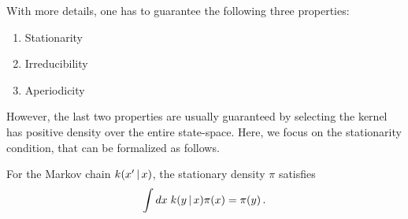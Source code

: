 With more details, one has to guarantee the following three properties:
\begin{enumerate}
    \item Stationarity 
    \item Irreducibility 
    \item Aperiodicity 
\end{enumerate}
However, the last two properties are usually guaranteed by selecting the kernel has positive density over the entire state-space. Here, we focus on the stationarity condition, that can be formalized as follows.
\begin{mybox}
\begin{definition}
    \label{def:stat_cond}
    For the Markov chain $k(x'\,|\, x)$, the stationary density $\pi$ satisfies
    \begin{align}
        \int dx\; k(y\,|\, x)\pi(x) = \pi(y)\,.
    \end{align}
\end{definition}    
\end{mybox}

